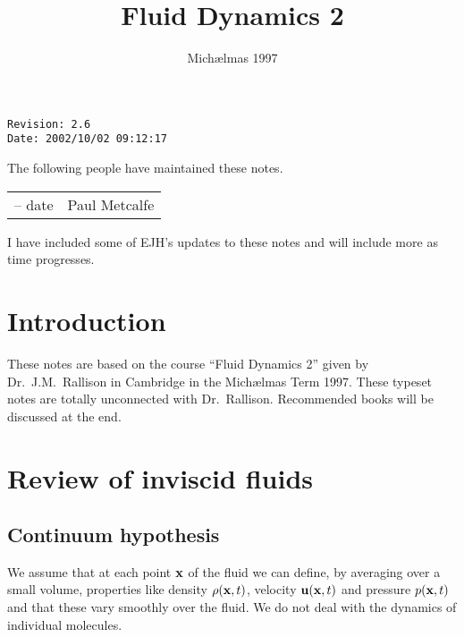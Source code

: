 \documentclass{notes}
\theoremstyle{plain}
\begin{document}
\frontmatter

\title{Fluid Dynamics 2}

\date{Mich\ae lmas 1997} \maketitle

\thispagestyle{empty}
\noindent\verb$Revision: 2.6 $\hfill\\
\noindent\verb$Date: 2002/10/02 09:12:17 $\hfill

\vspace{1.5in}

The following people have maintained these notes.

\begin{center}
\begin{tabular}{ r  l}
-- date & Paul Metcalfe
\end{tabular}
\end{center}

I have included some of EJH's updates to these notes and will include
more as time progresses.

\tableofcontents

\chapter{Introduction}

These notes are based on the course ``Fluid Dynamics 2'' given by
Dr.~J.M.~Rallison in Cambridge in the Mich\ae lmas Term 1997.  These
typeset notes are totally unconnected with Dr.~Rallison.  Recommended
books will be discussed at the end.

\alsoavailable
\archimcopyright

\mainmatter

\chapter{Review of inviscid fluids}

\section{Continuum hypothesis}

We assume that at each point $\mathbf{x}$ of the fluid we can define, by
averaging over a small volume,
properties like density $\rho(\mathbf{x},t)$, velocity $\mathbf{u}(\mathbf{x},t)$ and
pressure $p(\mathbf{x},t)$ and that these vary smoothly over the fluid.  We
do not deal with the dynamics of individual molecules.
\end{document}
